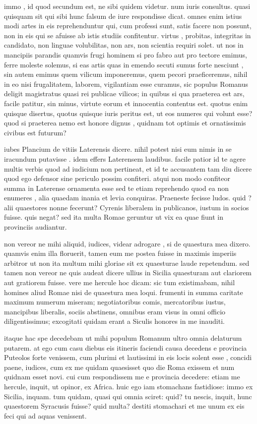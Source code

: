  immo , id quod secundum est, ne sibi quidem videtur. num iuris consultus. quasi quisquam sit qui sibi hunc falsum de iure respondisse dicat. omnes enim istius modi artes in eis reprehenduntur qui, cum professi sunt, satis facere non possunt, non in eis qui se afuisse ab istis studiis confitentur. virtus , probitas, integritas in candidato, non linguae volubilitas, non ars, non scientia requiri solet. ut nos in mancipiis parandis quamvis frugi hominem si pro fabro aut pro tectore emimus, ferre moleste solemus, si eas artis quas in emendo secuti sumus forte nesciunt , sin autem emimus quem vilicum imponeremus, quem pecori praeficeremus, nihil in eo nisi frugalitatem, laborem, vigilantiam esse curamus, sic populus Romanus deligit magistratus quasi rei publicae vilicos; in quibus si qua praeterea est ars, facile patitur, sin minus, virtute eorum et innocentia contentus est. quotus enim quisque disertus, quotus quisque iuris peritus est, ut eos numeres qui volunt esse? quod si praeterea nemo est honore dignus , quidnam tot optimis et ornatissimis civibus est futurum?

 iubes Plancium de vitiis Laterensis dicere. nihil potest nisi eum nimis in se iracundum putavisse . idem effers Laterensem laudibus. facile patior id te agere multis verbis quod ad iudicium non pertineat, et id te accusantem tam diu dicere quod ego defensor sine periculo possim confiteri. atqui non modo confiteor summa in Laterense ornamenta esse sed te etiam reprehendo quod ea non enumeres , alia quaedam inania et levia conquiras. Praeneste fecisse ludos. quid ? alii quaestores nonne fecerunt? Cyrenis liberalem in publicanos, iustum in socios fuisse. quis negat? sed ita multa Romae geruntur ut vix ea quae fiunt in provinciis audiantur.

 non vereor ne mihi aliquid, iudices, videar adrogare , si de quaestura mea dixero. quamvis enim illa floruerit, tamen eum me postea fuisse in maximis imperiis arbitror ut non ita multum mihi gloriae sit ex quaesturae laude repetendum. sed tamen non vereor ne quis audeat dicere ullius in Sicilia quaesturam aut clariorem aut gratiorem fuisse. vere me hercule hoc dicam: sic tum existimabam, nihil homines aliud Romae nisi de quaestura mea loqui. frumenti in summa caritate maximum numerum miseram; negotiatoribus comis, mercatoribus iustus, mancipibus liberalis, sociis abstinens, omnibus eram visus in omni officio diligentissimus; excogitati quidam erant a Siculis honores in me inauditi.

 itaque hac spe decedebam ut mihi populum Romanum ultro omnia delaturum putarem. at ego cum casu diebus eis itineris faciendi causa decedens e provincia Puteolos forte venissem, cum plurimi et lautissimi in eis locis solent esse , concidi paene, iudices, cum ex me quidam quaesisset quo die Roma exissem et num quidnam esset novi. cui cum respondissem me e provincia decedere: etiam me hercule, inquit, ut opinor, ex Africa. huic ego iam stomachans fastidiose: immo ex Sicilia, inquam. tum quidam, quasi qui omnia sciret: quid? tu nescis, inquit, hunc quaestorem Syracusis fuisse? quid multa? destiti stomachari et me unum ex eis feci qui ad aquas venissent.

